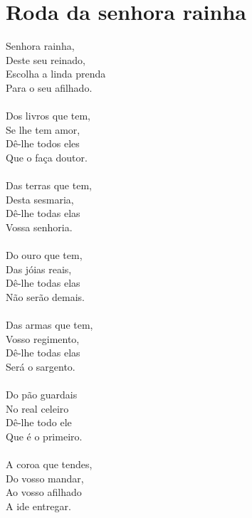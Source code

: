 \documentclass{article}
\begin{document}
\section{ Roda da senhora rainha}
Senhora rainha,\\
Deste seu reinado,\\
Escolha a linda prenda\\
Para o seu afilhado.\\
\\
Dos livros que tem,\\
Se lhe tem amor,\\
Dê-lhe todos eles\\
Que o faça doutor. \\
\\
Das terras que tem,\\
Desta sesmaria,\\
Dê-lhe todas elas\\
Vossa senhoria.\\
\\
Do ouro que tem,\\
Das jóias reais,\\
Dê-lhe todas elas\\
Não serão demais.\\
\\
Das armas que tem,\\
Vosso regimento,\\
Dê-lhe todas elas\\
Será o sargento.\\
\\
Do pão guardais\\
No real celeiro\\
Dê-lhe todo ele\\
Que é o primeiro.\\
\\
A coroa que tendes,\\
Do vosso mandar,\\
Ao vosso afilhado\\
A ide entregar.\\
\end{document}
